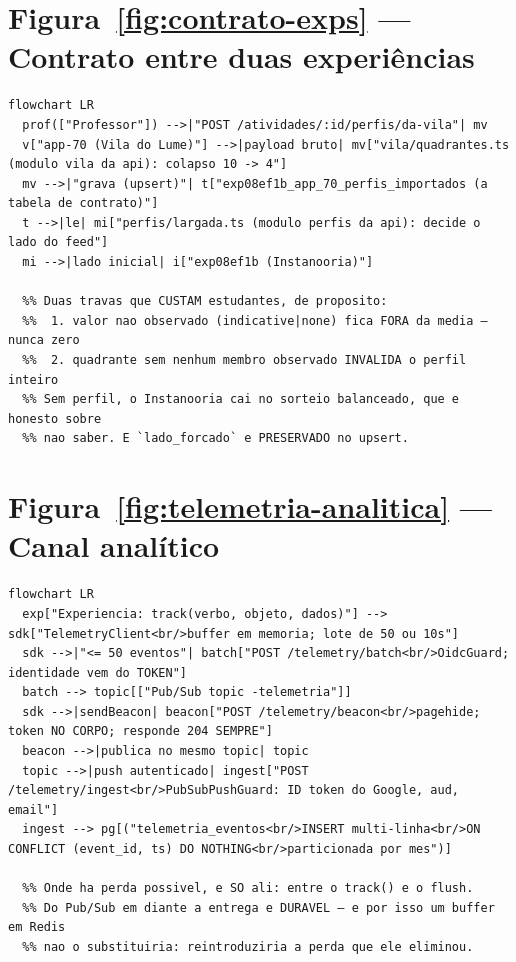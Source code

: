 \section{Figura~\ref{fig:contrato-exps} --- Contrato entre duas experiências}

\begin{lstlisting}[language=mermaid]
flowchart LR
  prof(["Professor"]) -->|"POST /atividades/:id/perfis/da-vila"| mv
  v["app-70 (Vila do Lume)"] -->|payload bruto| mv["vila/quadrantes.ts (modulo vila da api): colapso 10 -> 4"]
  mv -->|"grava (upsert)"| t["exp08ef1b_app_70_perfis_importados (a tabela de contrato)"]
  t -->|le| mi["perfis/largada.ts (modulo perfis da api): decide o lado do feed"]
  mi -->|lado inicial| i["exp08ef1b (Instanooria)"]

  %% Duas travas que CUSTAM estudantes, de proposito:
  %%  1. valor nao observado (indicative|none) fica FORA da media — nunca zero
  %%  2. quadrante sem nenhum membro observado INVALIDA o perfil inteiro
  %% Sem perfil, o Instanooria cai no sorteio balanceado, que e honesto sobre
  %% nao saber. E `lado_forcado` e PRESERVADO no upsert.
\end{lstlisting}

\section{Figura~\ref{fig:telemetria-analitica} --- Canal analítico}

\begin{lstlisting}[language=mermaid]
flowchart LR
  exp["Experiencia: track(verbo, objeto, dados)"] --> sdk["TelemetryClient<br/>buffer em memoria; lote de 50 ou 10s"]
  sdk -->|"<= 50 eventos"| batch["POST /telemetry/batch<br/>OidcGuard; identidade vem do TOKEN"]
  batch --> topic[["Pub/Sub topic -telemetria"]]
  sdk -->|sendBeacon| beacon["POST /telemetry/beacon<br/>pagehide; token NO CORPO; responde 204 SEMPRE"]
  beacon -->|publica no mesmo topic| topic
  topic -->|push autenticado| ingest["POST /telemetry/ingest<br/>PubSubPushGuard: ID token do Google, aud, email"]
  ingest --> pg[("telemetria_eventos<br/>INSERT multi-linha<br/>ON CONFLICT (event_id, ts) DO NOTHING<br/>particionada por mes")]

  %% Onde ha perda possivel, e SO ali: entre o track() e o flush.
  %% Do Pub/Sub em diante a entrega e DURAVEL — e por isso um buffer em Redis
  %% nao o substituiria: reintroduziria a perda que ele eliminou.
\end{lstlisting}

